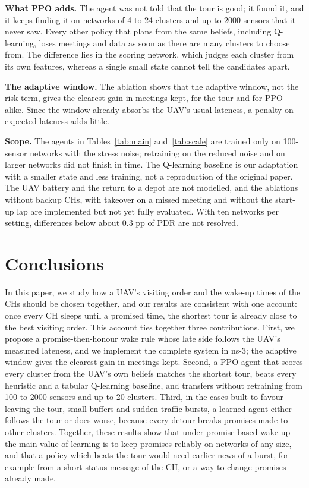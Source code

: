 \documentclass[conference]{IEEEtran}
\begin{document}
\textbf{What PPO adds.} The agent was not told that the tour is good; it found it, and it keeps
finding it on networks of 4 to 24 clusters and up to 2000 sensors that it never saw. Every other
policy that plans from the same beliefs, including Q-learning, loses meetings and data as soon as
there are many clusters to choose from. The difference lies in the scoring network, which judges
each cluster from its own features, whereas a single small state cannot tell the candidates
apart.

\textbf{The adaptive window.} The ablation shows that the adaptive window, not the risk term,
gives the clearest gain in meetings kept, for the tour and for PPO alike. Since the window already
absorbs the UAV's usual lateness, a penalty on expected lateness adds little.

\textbf{Scope.} The agents in Tables~\ref{tab:main} and~\ref{tab:scale} are trained only on
100-sensor networks with the stress noise; retraining on the reduced noise and on larger networks
did not finish in time. The Q-learning baseline is our adaptation with a smaller state and less
training, not a reproduction of the original paper. The UAV battery and the return to a depot are
not modelled, and the ablations without backup CHs, with takeover on a missed meeting and without
the start-up lap are implemented but not yet fully evaluated. With ten networks per setting,
differences below about 0.3 pp of PDR are not resolved.

\section{Conclusions}\label{sec:conclusion}

In this paper, we study how a UAV's visiting order and the wake-up times of the CHs should be
chosen together, and our results are consistent with one account: once every CH sleeps until a
promised time, the shortest tour is already close to the best visiting order. This account ties
together three contributions. First, we propose a promise-then-honour wake rule whose late side
follows the UAV's measured lateness, and we implement the complete system in ns-3; the adaptive
window gives the clearest gain in meetings kept. Second, a PPO agent that scores every cluster
from the UAV's own beliefs matches the shortest tour, beats every heuristic and a tabular
Q-learning baseline, and transfers without retraining from 100 to 2000 sensors and up to 20
clusters. Third, in the cases built to favour leaving the tour, small buffers and sudden traffic
bursts, a learned agent either follows the tour or does worse, because every detour breaks
promises made to other clusters. Together, these results show that under promise-based wake-up
the main value of learning is to keep promises reliably on networks of any size, and that a
policy which beats the tour would need earlier news of a burst, for example from a short status
message of the CH, or a way to change promises already made.



\end{document}
